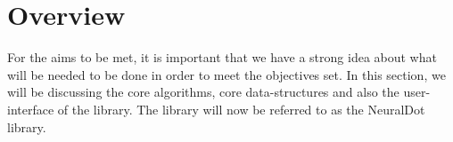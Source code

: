 \section{Overview}
For the aims to be met, it is important that we have a strong idea about what will be needed to be done in order to meet the objectives set. In this section, we will be discussing the core algorithms, core data-structures and also the user-interface of the library. The library will now be referred to as the NeuralDot library. 



